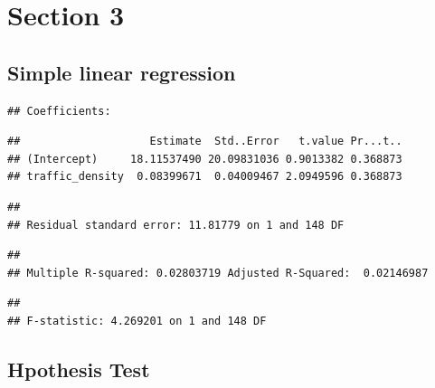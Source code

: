 \documentclass[
]{article}
\begin{document}
\hypertarget{section-3}{%
\section{Section 3}\label{section-3}}

\hypertarget{simple-linear-regression}{%
\subsection{Simple linear regression}\label{simple-linear-regression}}

\begin{verbatim}
## Coefficients:
\end{verbatim}

\begin{verbatim}
##                    Estimate  Std..Error   t.value Pr...t..
## (Intercept)     18.11537490 20.09831036 0.9013382 0.368873
## traffic_density  0.08399671  0.04009467 2.0949596 0.368873
\end{verbatim}

\begin{verbatim}
## 
## Residual standard error: 11.81779 on 1 and 148 DF
\end{verbatim}

\begin{verbatim}
## 
## Multiple R-squared: 0.02803719 Adjusted R-Squared:  0.02146987
\end{verbatim}

\begin{verbatim}
## 
## F-statistic: 4.269201 on 1 and 148 DF
\end{verbatim}

\hypertarget{hpothesis-test}{%
\subsection{Hpothesis Test}\label{hpothesis-test}}
\end{document}
